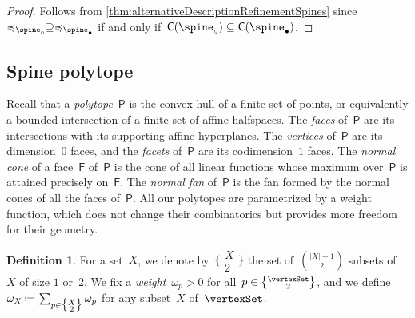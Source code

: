 \documentclass{amsart}
\theoremstyle{definition}
\newtheorem{definition}[theorem]{Definition}
\newcommand{\eqdef}{\mbox{\,\raisebox{0.2ex}{\scriptsize\ensuremath{\mathrm:}}\ensuremath{=}\,}} %
\newcommand{\darkblue}{\color{darkblue}} %
\newcommand{\defn}[1]{\textsl{\darkblue #1}} %
\newcommand{\normalCone}{\mathsf{C}} %
\newcommand{\polytope}[1]{\mathsf{#1}} %
\newcommand{\weight}{\omega} %
\newcommand{\monombinom}[1]{\big\{\!\begin{smallmatrix} #1 \\ 2 \end{smallmatrix}\!\big\}}
\begin{document}
\begin{proof}
  Follows from \cref{thm:alternativeDescriptionRefinementSpines} since~$\preccurlyeq_{\spine_\circ} \supseteq \preccurlyeq_{\spine_\bullet}$ if and only if~$\normalCone(\spine_\circ) \subseteq \normalCone(\spine_\bullet)$.
\end{proof}


\subsection{Spine polytope}
\label{subsec:spinePolytope}

Recall that a \defn{polytope}~$\polytope{P}$ is the convex hull of a finite set of points, or equivalently a bounded intersection of a finite set of affine halfspaces.
The \defn{faces} of~$\polytope{P}$ are its intersections with its supporting affine hyperplanes.
The \defn{vertices} of~$\polytope{P}$ are its dimension~$0$ faces, and the \defn{facets} of~$\polytope{P}$ are its codimension~$1$ faces.
The \defn{normal cone} of a face~$\polytope{F}$ of~$\polytope{P}$ is the cone of all linear functions whose maximum over~$\polytope{P}$ is attained precisely on~$\polytope{F}$.
The \defn{normal fan} of~$\polytope{P}$ is the fan formed by the normal cones of all the faces of~$\polytope{P}$.
All our polytopes are parametrized by a weight function, which does not change their combinatorics but provides more freedom for their geometry.

\begin{definition}
  \label{def:weight}
  For a set~$X$, we denote by~$\monombinom{X}$ the set of~$\binom{|X|+1}{2}$ subsets of~$X$ of size $1$ or~$2$.
  We fix a \defn{weight}~$\weight_p > 0$ for all~$p \in \monombinom{\vertexSet}$, and we define~$\weight_X \eqdef \sum_{p \in \monombinom{X}} \weight_p$ for any subset~$X$ of~$\vertexSet$.
\end{definition}
\end{document}
